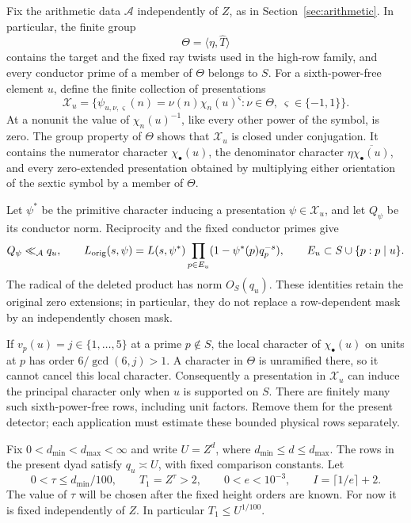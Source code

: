 \documentclass[11pt,a4paper]{article}
\numberwithin{equation}{section}
\numberwithin{figure}{section}
\theoremstyle{definition}
\theoremstyle{remark}
\begin{document}
Fix the arithmetic data \(\mathcal A\) independently of \(Z\), as in
Section~\ref{sec:arithmetic}.  In particular, the finite group
\[
 \Theta=\langle\eta,\widehat T\rangle
\]
contains the target and the fixed ray twists used in the high-row
family, and every conductor prime of a member of \(\Theta\) belongs
to \(S\).  For a
sixth-power-free element \(u\), define the finite collection of
presentations
\[
 \mathcal X_u=
 \bigl\{\psi_{u,\nu,\varsigma}(n)=\nu(n)\chi_n(u)^\varsigma:
       \nu\in\Theta,\ \varsigma\in\{-1,1\}\bigr\}.
\]
At a nonunit the value of \(\chi_n(u)^{-1}\), like every other
power of the symbol, is zero.  The group property of \(\Theta\)
shows that \(\mathcal X_u\) is closed under conjugation.  It contains
the numerator character \(\chi_\bullet(u)\), the denominator
character \(\eta\overline{\chi_\bullet(u)}\), and every zero-extended
presentation obtained by multiplying either orientation of the sextic
symbol by a member of \(\Theta\).

Let \(\psi^*\) be the primitive character inducing a presentation
\(\psi\in\mathcal X_u\), and let \(Q_\psi\) be its conductor norm.
Reciprocity and the fixed conductor primes give
\[
 Q_\psi\ll_{\mathcal A}q_u,\qquad
 L_{\rm orig}(s,\psi)
   =L(s,\psi^*)\prod_{p\in E_u}(1-\psi^*(p)q_p^{-s}),
 \qquad
 E_u\subset S\cup\{p:p\mid u\}.
\]
The radical of the deleted product has norm \(O_S(q_u)\).
These identities retain the original zero extensions; in particular,
they do not replace a row-dependent mask by an independently chosen
mask.

\label{par:physical-row-ramification}
If \(v_p(u)=j\in\{1,\ldots,5\}\) at a prime \(p\notin S\), the
local character of \(\chi_\bullet(u)\) on units at \(p\) has order
\(6/\gcd(6,j)>1\).  A character in \(\Theta\) is unramified there,
so it cannot cancel this local character.  Consequently a
presentation in \(\mathcal X_u\) can induce the principal character
only when \(u\) is supported on \(S\).  There are finitely many such
sixth-power-free rows, including unit factors.  Remove them for the
present detector; each application must estimate these bounded physical
rows separately.

Fix \(0<d_{\min}<d_{\max}<\infty\) and write \(U=Z^d\), where
\(d_{\min}\le d\le d_{\max}\).  The rows in the present dyad satisfy
\(q_u\asymp U\), with fixed comparison constants.  Let
\[
 0<\tau\le d_{\min}/100,\qquad T_1=Z^\tau>2,\qquad
 0<e<10^{-3},\qquad I=\lceil1/e\rceil+2.
\]
The value of \(\tau\) will be chosen after the fixed height orders
are known.  For now it is fixed independently of \(Z\).  In
particular \(T_1\le U^{1/100}\).
\end{document}
